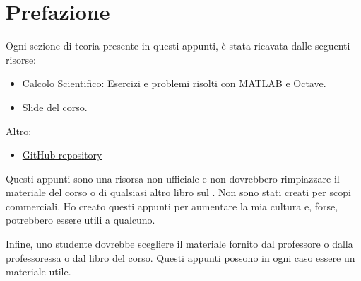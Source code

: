 \section*{Prefazione}

Ogni sezione di teoria presente in questi appunti, è stata ricavata dalle seguenti risorse:
\begin{itemize}
    \item Calcolo Scientifico: Esercizi e problemi risolti con MATLAB e Octave.\cite{quarteroni2017calcolo}
    \item Slide del corso.\cite{slides}
\end{itemize}
Altro:
\begin{itemize}
    \item[\faIcon{github}] \href{https://github.com/PoliMI-HPC-E-notes-projects-AndreVale69/HPC-E-PoliMI-university-notes}{GitHub repository}
    \begin{center}
    \end{center}
\end{itemize}

Questi appunti sono una risorsa non ufficiale e non dovrebbero rimpiazzare il materiale del corso o di qualsiasi altro libro sul . Non sono stati creati per scopi commerciali. Ho creato questi appunti per aumentare la mia cultura e, forse, potrebbero essere utili a qualcuno.

Infine, uno studente dovrebbe scegliere il materiale fornito dal professore o dalla professoressa o dal libro del corso. Questi appunti possono in ogni caso essere un materiale utile.